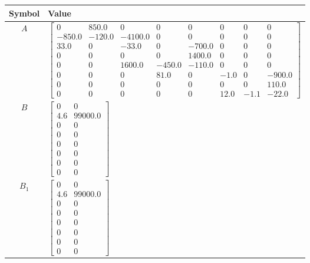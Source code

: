 \begin{tabular}{cl}
\hline
  Symbol  & Value                                                                                                                                                                                                                                                                                                                                                                        \\
\hline
   $A$    & $\left[\begin{matrix}0 & 850.0 & 0 & 0 & 0 & 0 & 0 & 0\\-850.0 & -120.0 & -4100.0 & 0 & 0 & 0 & 0 & 0\\33.0 & 0 & -33.0 & 0 & -700.0 & 0 & 0 & 0\\0 & 0 & 0 & 0 & 1400.0 & 0 & 0 & 0\\0 & 0 & 1600.0 & -450.0 & -110.0 & 0 & 0 & 0\\0 & 0 & 0 & 81.0 & 0 & -1.0 & 0 & -900.0\\0 & 0 & 0 & 0 & 0 & 0 & 0 & 110.0\\0 & 0 & 0 & 0 & 0 & 12.0 & -1.1 & -22.0\end{matrix}\right]$ \\
   $B$    & $\left[\begin{matrix}0 & 0\\4.6 & 99000.0\\0 & 0\\0 & 0\\0 & 0\\0 & 0\\0 & 0\\0 & 0\end{matrix}\right]$                                                                                                                                                                                                                                                                      \\
 $B_{1}$  & $\left[\begin{matrix}0 & 0\\4.6 & 99000.0\\0 & 0\\0 & 0\\0 & 0\\0 & 0\\0 & 0\\0 & 0\end{matrix}\right]$                                                                                                                                                                                                                                                                      \\

\end{tabular}
